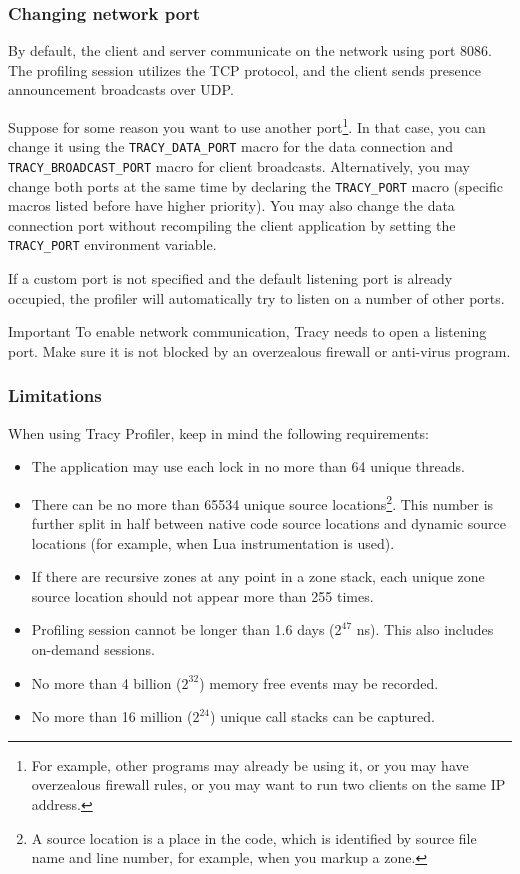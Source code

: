 \documentclass[hidelinks,titlepage,a4paper,twoside]{article}
\begin{document}
\subsubsection{Changing network port}

By default, the client and server communicate on the network using port 8086. The profiling session utilizes the TCP protocol, and the client sends presence announcement broadcasts over UDP.

Suppose for some reason you want to use another port\footnote{For example, other programs may already be using it, or you may have overzealous firewall rules, or you may want to run two clients on the same IP address.}. In that case, you can change it using the \texttt{TRACY\_DATA\_PORT} macro for the data connection and \texttt{TRACY\_BROADCAST\_PORT} macro for client broadcasts. Alternatively, you may change both ports at the same time by declaring the \texttt{TRACY\_PORT} macro (specific macros listed before have higher priority). You may also change the data connection port without recompiling the client application by setting the \texttt{TRACY\_PORT} environment variable.

If a custom port is not specified and the default listening port is already occupied, the profiler will automatically try to listen on a number of other ports.

\begin{bclogo}[
noborder=true,
couleur=black!5,
logo=\bcbombe
]{Important}
To enable network communication, Tracy needs to open a listening port. Make sure it is not blocked by an overzealous firewall or anti-virus program.
\end{bclogo}

\subsubsection{Limitations}

When using Tracy Profiler, keep in mind the following requirements:

\begin{itemize}
\item The application may use each lock in no more than 64 unique threads.
\item There can be no more than 65534 unique source locations\footnote{A source location is a place in the code, which is identified by source file name and line number, for example, when you markup a zone.}. This number is further split in half between native code source locations and dynamic source locations (for example, when Lua instrumentation is used).
\item If there are recursive zones at any point in a zone stack, each unique zone source location should not appear more than 255 times.
\item Profiling session cannot be longer than 1.6 days ($2^{47}$ \si{\nano\second}). This also includes on-demand sessions.
\item No more than 4 billion ($2^{32}$) memory free events may be recorded.
\item No more than 16 million ($2^{24}$) unique call stacks can be captured.
\end{itemize}
\end{document}
